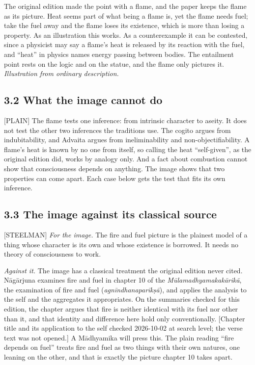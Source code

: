 \documentclass[11pt]{article}
\newcommand{\register}[1]{{\ttfamily\small #1}}
\begin{document}
The original edition made the point with a flame, and the paper keeps the flame as its picture. Heat seems part of what being a flame is, yet the flame needs fuel; take the fuel away and the flame loses its existence, which is more than losing a property. As an illustration this works. As a counterexample it can be contested, since a physicist may say a flame's heat is released by its reaction with the fuel, and ``heat'' in physics names energy passing between bodies. The entailment point rests on the logic and on the statue, and the flame only pictures it. \emph{Illustration from ordinary description.}

\subsection*{3.2 What the image cannot do}

\register{[PLAIN]} The flame tests one inference: from intrinsic character to aseity. It does not test the other two inferences the traditions use. The cogito argues from indubitability, and Advaita argues from ineliminability and non-objectifiability. A flame's heat is known by no one from itself, so calling the heat ``self-given'', as the original edition did, works by analogy only. And a fact about combustion cannot show that consciousness depends on anything. The image shows that two properties can come apart. Each case below gets the test that fits its own inference.

\subsection*{3.3 The image against its classical source}

\register{[STEELMAN]} \emph{For the image.} The fire and fuel picture is the plainest model of a thing whose character is its own and whose existence is borrowed. It needs no theory of consciousness to work.

\emph{Against it.} The image has a classical treatment the original edition never cited. Nāgārjuna examines fire and fuel in chapter 10 of the \emph{Mūlamadhyamakakārikā}, the examination of fire and fuel (\emph{agnīndhanaparīkṣā}), and applies the analysis to the self and the aggregates it appropriates. On the summaries checked for this edition, the chapter argues that fire is neither identical with its fuel nor other than it, and that identity and difference here hold only conventionally. [Chapter title and its application to the self checked 2026-10-02 at search level; the verse text was not opened.] A Mādhyamika will press this. The plain reading ``fire depends on fuel'' treats fire and fuel as two things with their own natures, one leaning on the other, and that is exactly the picture chapter 10 takes apart.
\end{document}
